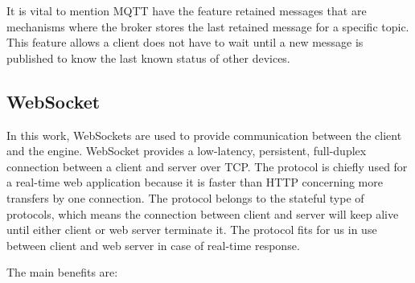 It is vital to mention MQTT have the feature retained messages that are mechanisms where the broker stores the last retained message for a specific topic. This feature allows a client does not have to wait until a new message is published to know the last known status of other devices.
 
\subsection{WebSocket}
 
In this work, WebSockets are used to provide communication between the client and the engine. WebSocket provides a low-latency, persistent, full-duplex connection between a client and server over TCP. The protocol is chiefly used for a real-time web application because it is faster than HTTP concerning more transfers by one connection. The protocol belongs to the stateful type of protocols, which means the connection between client and server will keep alive until either client or web server terminate it. The protocol fits for us in use between client and web server in case of real-time response.\citep{websocket_wang_salim_moskovits_2013}

The main benefits are:

